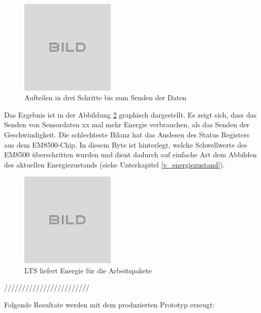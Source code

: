 \begin{figure}[ht]
    \includegraphics[width=0.4\textwidth]{idle.png}
    \caption{Aufteilen in drei Schritte bis zum Senden der Daten}
    \label{arbeitsaufteilung}
\end{figure}


Das Ergebnis ist in der Abbildung \ref{Sensor_Energie} graphisch dargestellt. Es zeigt sich, dass das Senden von Sensordaten  xx mal mehr Energie verbrauchen, als das Senden der Geschwindigkeit. Die schlechteste Bilanz hat das Auslesen des Status Registers aus dem EM8500-Chip. In diesem Byte ist hinterlegt, welche Schwellwerte des EM8500 überschritten wurden und dient dadurch auf einfache Art dem Abbilden des aktuellen Energiezustands (siehe Unterkapitel \ref{v_energiezustand}). 

\begin{figure}[ht]
    \includegraphics[width=0.4\textwidth]{idle.png}
    \caption{LTS liefert Energie für die Arbeitspakete}
    \label{Sensor_Energie}
\end{figure}




////////////////////////

Folgende Resultate werden mit dem produzierten Prototyp erzeugt:

